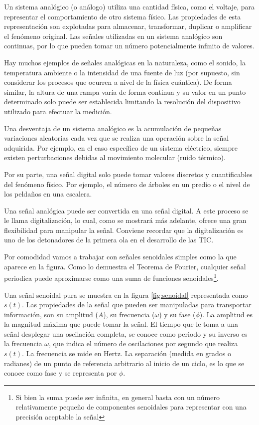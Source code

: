 \documentclass[
]{book}
\begin{document}
Un sistema analógico (o análogo) utiliza una cantidad física, como el voltaje, para representar el comportamiento de otro sistema físico. Las propiedades de esta representación son explotadas para almacenar, transformar, duplicar o amplificar el fenómeno original. Las señales utilizadas en un sistema analógico son continuas, por lo que pueden tomar un número potencialmente infinito de valores.

Hay muchos ejemplos de señales analógicas en la naturaleza, como el sonido, la temperatura ambiente o la intensidad de una fuente de luz (por supuesto, sin considerar los procesos que ocurren a nivel de la física cuántica). De forma similar, la altura de una rampa varía de forma continua y su valor en un punto determinado solo puede ser establecida limitando la resolución del dispositivo utilizado para efectuar la medición.

Una desventaja de un sistema analógico es la acumulación de pequeñas variaciones aleatorias cada vez que se realiza una operación sobre la señal adquirida. Por ejemplo, en el caso específico de un sistema eléctrico, siempre existen perturbaciones debidas al movimiento molecular (ruido térmico).

Por su parte, una señal digital solo puede tomar valores discretos y cuantificables del fenómeno físico. Por ejemplo, el número de árboles en un predio o el nivel de los peldaños en una escalera.

Una señal analógica puede ser convertida en una señal digital. A este proceso se le llama digitalización, lo cual, como se mostrará más adelante, ofrece una gran flexibilidad para manipular la señal. Conviene recordar que la digitalización es uno de los detonadores de la primera ola en el desarrollo de las TIC.

Por comodidad vamos a trabajar con señales senoidales simples como la que aparece en la figura. Como lo demuestra el Teorema de Fourier, cualquier señal periodica puede aproximarse como una suma de funciones senoidales\footnote{Si bien la suma puede ser infinita, en general basta con un número relativamente pequeño de componentes senoidales para representar con una precisión aceptable la señal}.

Una señal senoidal pura se muestra en la figura \ref{fig:senoidal} representada como \(s(t)\). Las propiedades de la señal que pueden ser manipuladas para transportar información, son su amplitud (\(A\)), su frecuencia (\(\omega\)) y su fase (\(\phi\)). La amplitud es la magnitud máxima que puede tomar la señal. El tiempo que le toma a una señal desplegar una oscilación completa, se conoce como periodo y su inverso es la frecuencia \(\omega\), que indica el número de oscilaciones por segundo que realiza \(s(t)\). La frecuencia se mide en Hertz. La separación (medida en grados o radianes) de un punto de referencia arbitrario al inicio de un ciclo, es lo que se conoce como fase y se representa por \(\phi\).
\end{document}
